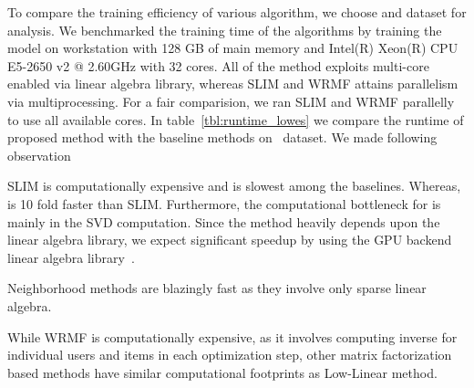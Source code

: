 
To compare the training efficiency of various algorithm, we choose \Lowes and \MLens dataset for analysis.
We benchmarked the training time of the algorithms 
by training the model on  workstation with 128 GB of main memory and Intel(R) Xeon(R) CPU E5-2650 v2 @ 2.60GHz with 32 cores. All of the method exploits multi-core enabled via linear algebra library, whereas SLIM and WRMF attains parallelism via multiprocessing. For a fair comparision, we ran  SLIM and WRMF parallelly to use all available cores.  In table~\ref{tbl:runtime_lowes} we compare the runtime of proposed method with the baseline methods on \Lowes\ dataset. We  made following observation
\begin{compactitem}
\item  SLIM is computationally expensive and is slowest among the baselines. Whereas, \LinearLow is 10 fold faster than SLIM. Furthermore, the computational bottleneck for \LinearLow is mainly in the SVD computation. Since the method heavily depends upon the linear algebra library, we expect significant speedup by using the GPU backend linear algebra library~\citep{Voronin:GPURSVD}. 
\item Neighborhood methods are blazingly fast as they involve only sparse linear algebra.
\item While WRMF is computationally expensive, as it involves computing inverse for individual users and items in each optimization step, other matrix factorization based methods have similar computational footprints as Low-Linear method.
\end{compactitem}

\begin{table}
\caption{Training time on the  \Lowes  and \MLens Dataset.}
\label{tbl:runtime_lowes}
\centering
{}

\end{table}